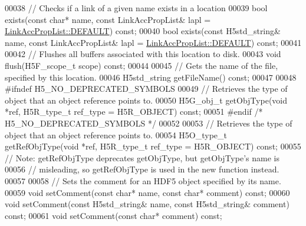 \begin{DoxyCode}
00038         \textcolor{comment}{// Checks if a link of a given name exists in a location}
00039         \textcolor{keywordtype}{bool} exists(\textcolor{keyword}{const} \textcolor{keywordtype}{char}* name, \textcolor{keyword}{const} LinkAccPropList& lapl = 
      \hyperlink{class_h5_1_1_link_acc_prop_list_abbf34b03d8f8c9cf225c704d59ebb7a8}{LinkAccPropList::DEFAULT}) \textcolor{keyword}{const};
00040         \textcolor{keywordtype}{bool} exists(\textcolor{keyword}{const} H5std\_string& name, \textcolor{keyword}{const} LinkAccPropList& lapl = 
      \hyperlink{class_h5_1_1_link_acc_prop_list_abbf34b03d8f8c9cf225c704d59ebb7a8}{LinkAccPropList::DEFAULT}) \textcolor{keyword}{const};
00041 
00042         \textcolor{comment}{// Flushes all buffers associated with this location to disk.}
00043         \textcolor{keywordtype}{void} flush(H5F\_scope\_t scope) \textcolor{keyword}{const};
00044 
00045         \textcolor{comment}{// Gets the name of the file, specified by this location.}
00046         H5std\_string getFileName() \textcolor{keyword}{const};
00047 
00048 \textcolor{preprocessor}{#ifndef H5\_NO\_DEPRECATED\_SYMBOLS}
00049         \textcolor{comment}{// Retrieves the type of object that an object reference points to.}
00050         H5G\_obj\_t getObjType(\textcolor{keywordtype}{void} *ref, H5R\_type\_t ref\_type = H5R\_OBJECT) \textcolor{keyword}{const};
00051 \textcolor{preprocessor}{#endif }\textcolor{comment}{/* H5\_NO\_DEPRECATED\_SYMBOLS */}\textcolor{preprocessor}{}
00052 
00053         \textcolor{comment}{// Retrieves the type of object that an object reference points to.}
00054         H5O\_type\_t getRefObjType(\textcolor{keywordtype}{void} *ref, H5R\_type\_t ref\_type = H5R\_OBJECT) \textcolor{keyword}{const};
00055         \textcolor{comment}{// Note: getRefObjType deprecates getObjType, but getObjType's name is}
00056         \textcolor{comment}{// misleading, so getRefObjType is used in the new function instead.}
00057 
00058         \textcolor{comment}{// Sets the comment for an HDF5 object specified by its name.}
00059         \textcolor{keywordtype}{void} setComment(\textcolor{keyword}{const} \textcolor{keywordtype}{char}* name, \textcolor{keyword}{const} \textcolor{keywordtype}{char}* comment) \textcolor{keyword}{const};
00060         \textcolor{keywordtype}{void} setComment(\textcolor{keyword}{const} H5std\_string& name, \textcolor{keyword}{const} H5std\_string& comment) \textcolor{keyword}{const};
00061         \textcolor{keywordtype}{void} setComment(\textcolor{keyword}{const} \textcolor{keywordtype}{char}* comment) \textcolor{keyword}{const};

\end{DoxyCode}
